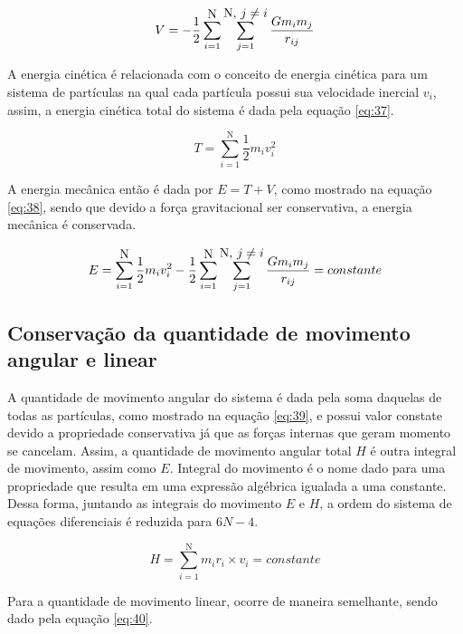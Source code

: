 \begin{equation}
    V = -\frac{1}{2} \sum\limits_{i=1}^{\mbox{N}} \sum\limits_{j=1}^{\mbox{N, $ j\neq i $}} \frac{Gm_{i} m_{j}}{r_{ij}}
    \label{eq:36}
\end{equation}

A energia cinética é relacionada com o conceito de energia cinética para um sistema de partículas na qual cada partícula possui sua velocidade inercial $v_{i}$, assim, a energia cinética total do sistema é dada pela equação \ref{eq:37}.

\begin{equation}
    T = \sum\limits_{i=1}^{\mbox{N}} \frac{1}{2}m_{i}v_{i}^{2}
\label{eq:37}
\end{equation}

A energia mecânica então é dada por $E = T + V$, como mostrado na equação \ref{eq:38}, sendo que devido a força gravitacional ser conservativa, a energia mecânica é conservada. 

\begin{equation}
    E = \sum\limits_{i=1}^{\mbox{N}} \frac{1}{2}m_{i}v_{i}^{2} -\frac{1}{2} \sum\limits_{i=1}^{\mbox{N}} \sum\limits_{j=1}^{\mbox{N, $ j\neq i $}} \frac{Gm_{i}m_{j}}{r_{ij}} = constante 
    \label{eq:38}
\end{equation} 

\subsection{Conservação da quantidade de movimento angular e linear}

A quantidade de movimento angular do sistema é dada pela soma daquelas de todas as partículas, como mostrado na equação \ref{eq:39}, e possui valor constate devido a propriedade conservativa já que as forças internas que geram momento se cancelam. Assim, a quantidade de movimento angular total $H$ é outra integral de movimento, assim como $E$. Integral do movimento é o nome dado para uma propriedade que resulta em uma expressão algébrica igualada a uma constante. Dessa forma, juntando as integrais do movimento $E$ e $H$, a ordem do sistema de equações diferenciais é reduzida para $6N-4$.

\begin{equation}
    H = \sum\limits_{i=1}^{\mbox{N}} m_{i}r_{i} \times v_{i} = constante
    \label{eq:39}
\end{equation}

Para a quantidade de movimento linear, ocorre de maneira semelhante, sendo dado pela equação \ref{eq:40}. 

